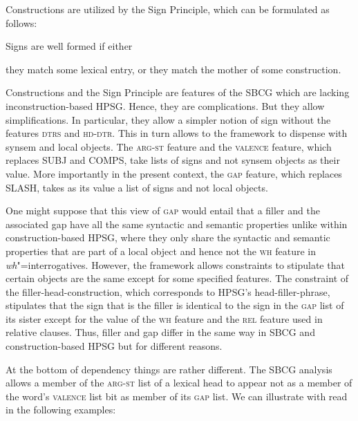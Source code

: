 \documentclass[output=paper
                ,modfonts
                ,nonflat
	        ,collection
	        ,collectionchapter
	        ,collectiontoclongg
 	        ,biblatex
                ,babelshorthands
                ,newtxmath
                ,draftmode
                ,colorlinks, citecolor=brown
]{./langsci/langscibook}
\begin{document}
{\begin{exe}
\end{exe}
\noindent
Constructions are utilized by the Sign Principle, which can be formulated as follows:

\begin{exe}
  \ex \label{ex:UDC:SBCG:SignPrinciple} Signs are well formed if either

  \begin{xlist}
    \ex they match some lexical entry, or \ex they match the mother of
    some construction.
  \end{xlist}
\end{exe}

\noindent
Constructions and the Sign Principle are features of the SBCG which are lacking inconstruction-based HPSG. Hence, they are complications. But they allow simplifications. In particular, they allow a simpler notion of sign without the features \textsc{dtrs} and \textsc{hd-dtr}. This in turn allows to the framework to dispense with synsem and local objects. The \textsc{arg-st} feature and the \textsc{valence} feature, which replaces SUBJ and COMPS, take lists of signs and not synsem objects as their value. More importantly in the present context, the \textsc{gap} feature, which replaces SLASH, takes as its value a list of signs and not local objects. 

One might suppose that this view of \textsc{gap} would entail that a filler and
the associated gap have all the same syntactic and semantic properties
unlike within construction-based HPSG, where they only share the
syntactic and semantic properties that are part of a local object and
hence not the \textsc{wh} feature in \emph{wh}"=interrogatives. However, the framework
allows constraints to stipulate that certain objects are the same
except for some specified features. The constraint of the
filler-head-construction, which corresponds to HPSG’s
head-filler-phrase, stipulates that the sign that is the filler is
identical to the sign in the \textsc{gap} list of its sister except for the
value of the \textsc{wh} feature and the \textsc{rel} feature used in relative
clauses. Thus, filler and gap differ in the same way in SBCG and
construction-based HPSG but for different reasons.

At the bottom of dependency things are rather different. The SBCG
analysis allows a member of the \textsc{arg-st} list of a lexical head to
appear not as a member of the word’s \textsc{valence} list bit as member of its
\textsc{gap} list. We can illustrate with read in the following examples:

}
\end{document}
